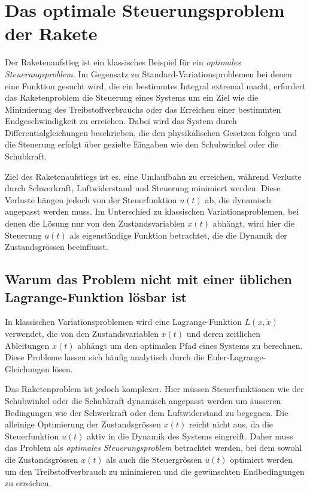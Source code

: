 %
%
%
%

\section{Das optimale Steuerungsproblem der Rakete \label{leo:section:optimalsteuerung}}

Der Raketenaufstieg ist ein klassisches Beispiel für ein \textit{optimales Steuerungsproblem}. 
%
Im Gegensatz zu Standard-Variationsproblemen bei denen eine Funktion gesucht wird, die ein bestimmtes Integral extremal macht, erfordert das Raketenproblem die Steuerung eines Systems um ein Ziel wie die Minimierung des Treibstoffverbrauchs oder das Erreichen einer bestimmten Endgeschwindigkeit zu erreichen. Dabei wird das System durch Differentialgleichungen beschrieben, die den physikalischen Gesetzen folgen und die Steuerung erfolgt über gezielte Eingaben wie den Schubwinkel oder die Schubkraft.

Ziel des Raketenaufstiegs ist es, eine Umlaufbahn zu erreichen, während Verluste durch Schwerkraft, Luftwiderstand und Steuerung minimiert werden. 
Diese Verluste hängen jedoch von der Steuerfunktion \( u(t) \) ab, die dynamisch angepasst werden muss. 
Im Unterschied zu klassischen Variationsproblemen, bei denen die Lösung nur von den Zustandsvariablen \( x(t) \) abhängt, wird hier die Steuerung \( u(t) \) als eigenständige Funktion betrachtet, die die Dynamik der Zustandsgrössen beeinflusst.

\subsection{Warum das Problem nicht mit einer üblichen Lagrange-Funk\-tion lösbar ist}

In klassischen Variationsproblemen wird eine Lagrange-Funktion \(L(x, \dot{x})\) verwendet, die von den Zustandsvariablen \(x(t)\) und deren zeitlichen Ableitungen \(\dot{x}(t)\) abhängt um den optimalen Pfad eines Systems zu berechnen. 
Diese Probleme lassen sich häufig analytisch durch die Euler-Lagrange-Gleichungen lösen.

Das Raketenproblem ist jedoch komplexer. 
Hier müssen Steuerfunktionen wie der Schubwinkel oder die Schubkraft dynamisch angepasst werden um äusseren Bedingungen wie der Schwerkraft oder dem Luftwiderstand zu begegnen. 
Die alleinige Optimierung der Zustandsgrössen \(x(t)\) reicht nicht aus, da die Steuerfunktion \(u(t)\) aktiv in die Dynamik des Systems eingreift. 
Daher muss das Problem als \textit{optimales Steuerungsproblem} betrachtet werden, bei dem sowohl die Zustandsgrössen \(x(t)\) als auch die Steuergrössen \(u(t)\) optimiert werden um den Treibstoffverbrauch zu minimieren und die gewünschten Endbedingungen zu erreichen.

